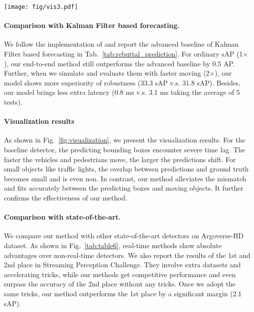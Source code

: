 \documentclass[10pt,twocolumn,letterpaper]{article}
\begin{document}
\begin{figure*}[t]
\setlength{\abovecaptionskip}{0pt}
\begin{center}
\texttt{[image: fig/vis3.pdf]}
\end{center}
\caption{Visualization results of the baseline detector and the proposed method. The green boxes represent ground truth boxes, while red ones represent prediction results.}
\vspace{-0.4cm}
\label{fig:visualization}
\end{figure*}

\paragraph{Comparison with Kalman Filter based forecasting.} We follow the implementation of \cite{streamer} and report the advanced baseline of Kalman Filter based forecasting in Tab.~\ref{tab:rebuttal_prediction}. For ordinary sAP (1$\times$), our end-to-end method still outperforms the advanced baseline by 0.5 AP. Further, when we simulate and evaluate them with faster moving (2$\times$), our model shows more superiority of robustness (33.3 sAP v.s. 31.8 sAP). Besides, our model brings less extra latency (0.8 ms v.s. 3.1 ms taking the average of 5 tests).


\paragraph{Visualization results}
As shown in Fig.~\ref{fig:visualization}, we present the visualization results. For the baseline detector, the predicting bounding boxes encounter severe time lag. The faster the vehicles and pedestrians move, the larger the predictions shift. For small objects like traffic lights, the overlap between predictions and ground truth becomes small and is even non. In contrast, our method alleviates the mismatch and fits accurately between the predicting boxes and moving objects. It further confirms the effectiveness of our method.

\paragraph{Comparison with state-of-the-art.}
We compare our method with other state-of-the-art detectors on Argoverse-HD dataset. As shown in Fig.~\ref{tab:table6}, real-time methods show absolute advantages over non-real-time detectors.
We also report the results of the 1st and 2nd place in Streaming Perception Challenge. They involve extra datasets and accelerating tricks, while our methods get competitive performance and even surpass the accuracy of the 2nd place without any tricks. Once we adopt the same tricks, our method outperforms the 1st place by a significant margin (2.1 sAP).
\end{document}
